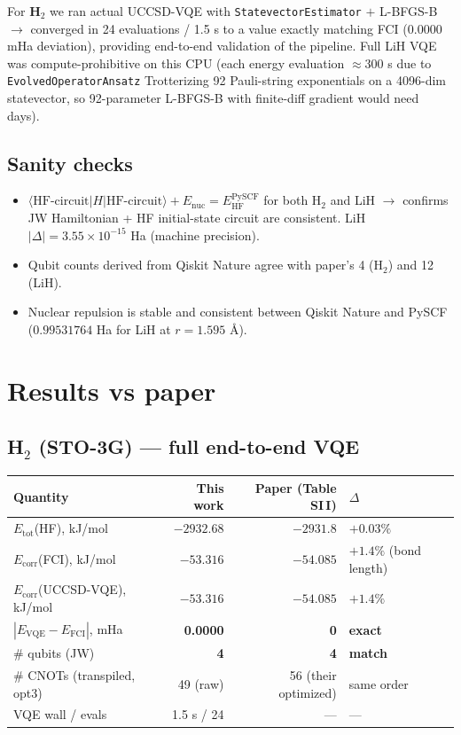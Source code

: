 \documentclass[11pt]{article}
\begin{document}
For \textbf{H$_2$} we ran actual UCCSD-VQE with \texttt{StatevectorEstimator}
$+$ L-BFGS-B $\to$ converged in 24 evaluations / 1.5 s to a value exactly
matching FCI ($0.0000$ mHa deviation), providing end-to-end validation of
the pipeline. Full LiH VQE was compute-prohibitive on this CPU (each energy
evaluation $\approx 300$ s due to \texttt{EvolvedOperatorAnsatz}
Trotterizing 92 Pauli-string exponentials on a 4096-dim statevector, so
92-parameter L-BFGS-B with finite-diff gradient would need days).

\subsection{Sanity checks}
\begin{itemize}
  \item $\langle \text{HF-circuit} | H | \text{HF-circuit}\rangle +
        E_\text{nuc} = E_\text{HF}^\text{PySCF}$ for both H$_2$ and LiH
        $\to$ confirms JW Hamiltonian + HF initial-state circuit are
        consistent. LiH $|\Delta| = 3.55\times 10^{-15}$ Ha (machine precision).
  \item Qubit counts derived from Qiskit Nature agree with paper's 4 (H$_2$)
        and 12 (LiH).
  \item Nuclear repulsion is stable and consistent between Qiskit Nature
        and PySCF ($0.99531764$ Ha for LiH at $r=1.595$ \AA).
\end{itemize}

\section{Results vs paper}

\subsection{H$_2$ (STO-3G) --- full end-to-end VQE}
\begin{center}
\begin{tabular}{lrrl}
\toprule
Quantity & This work & Paper (Table SI\,I) & $\Delta$ \\
\midrule
$E_\text{tot}$(HF), kJ/mol & $-2932.68$ & $-2931.8$ & $+0.03\%$ \\
$E_\text{corr}$(FCI), kJ/mol & $-53.316$ & $-54.085$ & $+1.4\%$ (bond length) \\
$E_\text{corr}$(UCCSD-VQE), kJ/mol & $-53.316$ & $-54.085$ & $+1.4\%$ \\
$|E_\text{VQE}-E_\text{FCI}|$, mHa & \textbf{0.0000} & \textbf{0} & \textbf{exact} \\
\# qubits (JW) & \textbf{4} & \textbf{4} & \textbf{match} \\
\# CNOTs (transpiled, opt3) & 49 (raw) & 56 (their optimized) & same order \\
VQE wall / evals & 1.5 s / 24 & --- & --- \\
\bottomrule
\end{tabular}
\end{center}
\end{document}

